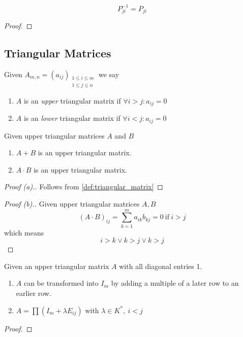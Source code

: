 \begin{proposition}[\(P_{ji}^{-1}\) is inverse of \(Z_3\)]
   \[P_{ji}^{-1} = P_{ji}\]
\end{proposition}
\begin{proof}
\end{proof}

\subsection{Triangular Matrices}
\begin{definition}\label{def:triangular_matrix}
   Given \(A_{m,n} = (a_{ij})_{\substack{1 \leq i \leq m \\ 1 \leq j \leq n}}\) we say

   \begin{enumerate}[label=(\roman*)]
      \item \(A\) is an \textit{upper} triangular matrix if \(\forall i > j: a_{ij} = 0\)
      \item \(A\) is an \textit{lower} triangular matrix if \(\forall i < j: a_{ij} = 0\)
   \end{enumerate}
\end{definition}

\begin{proposition}
   Given upper triangular matrices \(A\) and \(B\)

   \begin{enumerate}[label=(\alph*)]
      \item \(A + B\) is an upper triangular matrix.
      \item \(A \cdot B\) is an upper triangular matrix.
   \end{enumerate}
\end{proposition}
\begin{proof}[Proof (a).]
   Follows from \cref{def:triangular_matrix}
\end{proof}
\begin{proof}[Proof (b).]
   Given upper triangular matrices \(A, B\)
   \[(A \cdot B)_{ij} = \displaystyle\sum_{k=1}^m a_{ik} b_{kj} = 0~\text{if}~i > j\]
   which means
   \[i > k \lor k > j \lor k > j\]
\end{proof}

\begin{proposition}
   Given an upper triangular matrix \(A\) with all diagonal entries 1.

   \begin{enumerate}[label=(\alph*)]
      \item \(A\) can be transformed into \(I_m\) by adding a multiple of a later row to an earlier row.
      \item \(A = \prod(I_m + \lambda E_{ij})\) with \(\lambda \in K^*,~i < j\)
   \end{enumerate}
\end{proposition}
\begin{proof}
\end{proof}

